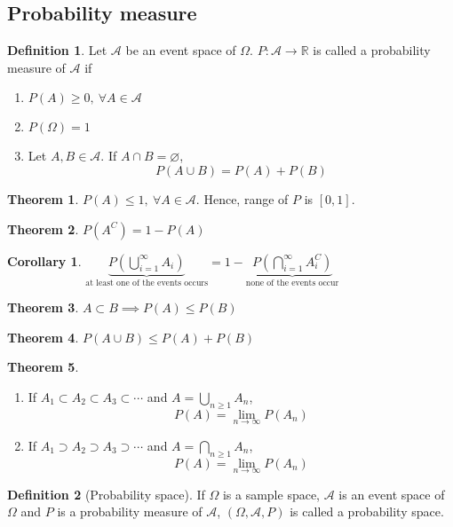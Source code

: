 \documentclass[10pt, a4paper]{extarticle}
\theoremstyle{definition}
\newtheorem{thm}{Theorem}
\newtheorem{cor}{Corollary}[thm]
\newtheorem{defn}{Definition}
\begin{document}
\subsection{Probability measure}
\begin{defn}
	Let $\mathscr{A}$ be an event space of $\Omega$. $P:\mathscr{A}\to \mathbb{R}$ is called a probability measure of $\mathscr{A}$ if
	\begin{enumerate}
		\item $P(A)\geq 0,\ \forall A\in\mathscr{A}$
		\item $P(\Omega)=1$
		\item Let $A,B\in\mathscr{A}$. If $A\cap B =\varnothing$,
		      \[P(A\cup B)=P(A)+P(B)\]
	\end{enumerate}
\end{defn}
\begin{thm}
	$P(A)\leq 1,\ \forall A\in\mathscr{A}$. Hence, range of $P$ is $[0,1]$.
\end{thm}
\begin{thm}
	$P(A^C)=1-P(A)$
\end{thm}
\begin{cor}
	$\underbrace{P\left(\bigcup\limits_{i=1}^\infty A_i\right)}_{\text{at least one of the events occurs}}=1-\underbrace{P\left(\bigcap\limits_{i=1}^\infty A_i^C\right)}_{\text{none of the events occur}}$
\end{cor}
\begin{thm}
	$A\subset B\implies P(A)\leq P(B)$
\end{thm}
\begin{thm}
	$P(A\cup B)\leq P(A)+P(B)$
\end{thm}

\begin{thm}
	\hfill
	\begin{enumerate}
		\item If $A_1\subset A_2\subset A_3\subset\cdots$ and $A=\bigcup\limits_{n\geq 1} A_n$,
		      \[P(A)=\lim\limits_{n\to\infty}P(A_n)\]
		\item If $A_1\supset A_2\supset A_3\supset\cdots$ and $A=\bigcap\limits_{n\geq 1} A_n$,
		      \[P(A)=\lim\limits_{n\to\infty}P(A_n)\]
	\end{enumerate}
\end{thm}
\begin{defn}[Probability space]
	If $\Omega$ is a sample space, $\mathscr{A}$ is an event space of $\Omega$ and $P$ is a probability measure of $\mathscr{A}$, $(\Omega, \mathscr{A}, P)$ is called a probability space.
\end{defn}
\end{document}

